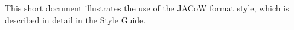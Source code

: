 This short document illustrates the use of the JACoW format style, which is described in detail in the Style Guide. 

